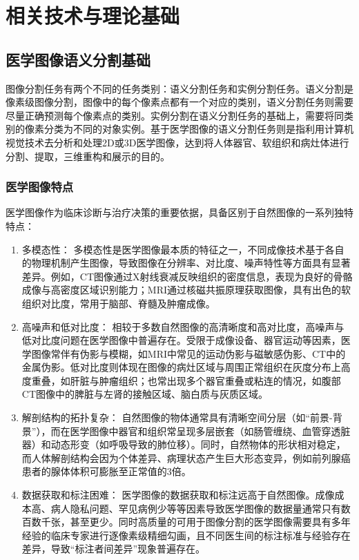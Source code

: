 \section{相关技术与理论基础}

\subsection{医学图像语义分割基础}

图像分割任务有两个不同的任务类别：语义分割任务和实例分割任务\cite{azad2024}。语义分割是像素级图像分割，图像中的每个像素点都有一个对应的类别，语义分割任务则需要尽量正确预测每个像素点的类别。实例分割在语义分割任务的基础上，需要将同类别的像素分类为不同的对象实例。基于医学图像的语义分割任务则是指利用计算机视觉技术去分析和处理2D或3D医学图像，达到将人体器官、软组织和病灶体进行分割、提取，三维重构和展示的目的\cite{liu2021}。


\subsubsection{医学图像特点}

医学图像作为临床诊断与治疗决策的重要依据，具备区别于自然图像的一系列独特特点：

\begin{enumerate}
    \item 多模态性： 
    多模态性是医学图像最本质的特征之一，不同成像技术基于各自的物理机制产生图像，导致图像在分辨率、对比度、噪声特性等方面具有显著差异。例如，CT图像通过X射线衰减反映组织的密度信息，表现为良好的骨骼成像与高密度区域识别能力；MRI通过核磁共振原理获取图像，具有出色的软组织对比度，常用于脑部、脊髓及肿瘤成像。
    
    \item 高噪声和低对比度：
    相较于多数自然图像的高清晰度和高对比度，高噪声与低对比度问题在医学图像中普遍存在。受限于成像设备、器官运动等因素，医学图像常伴有伪影与模糊，如MRI中常见的运动伪影与磁敏感伪影、CT中的金属伪影。低对比度则体现在图像的病灶区域与周围正常组织在灰度分布上高度重叠，如肝脏与肿瘤组织；也常出现多个器官重叠或粘连的情况，如腹部CT图像中的脾脏与左肾的接触区域、脑白质与灰质区域。
    
    \item 解剖结构的拓扑复杂：
    自然图像的物体通常具有清晰空间分层（如“前景-背景”），而在医学图像中器官和组织常呈现多层嵌套（如肠管缠绕、血管穿透脏器）和动态形变（如呼吸导致的肺位移）。同时，自然物体的形状相对稳定，而人体解剖结构会因为个体差异、病理状态产生巨大形态变异，例如前列腺癌患者的腺体体积可膨胀至正常值的3倍。
    
    \item 数据获取和标注困难：
    医学图像的数据获取和标注远高于自然图像。成像成本高、病人隐私问题、罕见病例少等等因素导致医学图像的数据量通常只有数百数千张，甚至更少。同时高质量的可用于图像分割的医学图像需要具有多年经验的临床专家进行逐像素级精细勾画，且不同医生间的标注标准与经验存在差异，导致“标注者间差异”现象普遍存在。

\end{enumerate}

